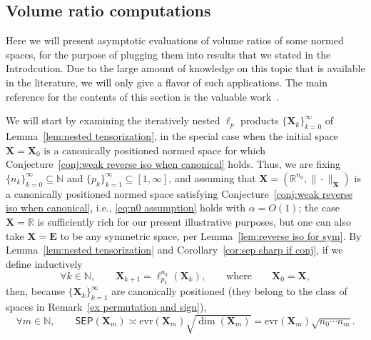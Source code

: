 \documentclass[11pt,reqno]{amsart}
\newcommand{\evr}{\mathrm{evr}}
\newcommand{\X}{\mathbf X}
\newcommand{\R}{\mathbb R}
\theoremstyle{remark}
\renewcommand{\subset}{\subseteq}
\newcommand{\N}{\mathbb N}
\renewcommand{\1}{\mathbf 1}
\newcommand{\sep}{\mathsf{SEP}}
\newcommand{\bfE}{\mathbf{E}}
\begin{document}
\subsection{Volume ratio computations}\label{sec:volume ratios} Here we will present asymptotic evaluations of volume ratios of some  normed spaces, for the purpose of plugging them into results that we stated in the Introdcution. Due to the large amount of knowledge on this topic that is available in the literature, we will only give a flavor of such applications. The main reference  for the contents of this section is the valuable work~\cite{Sch82}.

We will start by examining  the iteratively nested $\ell_p$ products $\{\X_k\}_{k=0}^\infty$ of Lemma~\ref{lem:nested tensorization}, in the special case when the initial space $\X=\X_0$  is a canonically positioned normed space for which Conjecture~\ref{conj:weak reverse iso when canonical} holds. Thus, we are fixing $\{n_k\}_{k=0}^\infty\subset  \N$ and $\{p_k\}_{k=1}^\infty\subset [1,\infty]$, and assuming that $\X=(\R^{n_0},\|\cdot\|_\X)$ is a canonically positioned normed space satisfying Conjecture~\ref{conj:weak reverse iso when canonical}, i.e., \eqref{eq:n0 assumption} holds with $\alpha=O(1)$; the case $\X=\R$ is sufficiently rich for our present illustrative purposes, but one can also take $\X=\bfE$ to be any symmetric space, per Lemma~\ref{lem:reverse iso for sym}. By Lemma~\ref{lem:nested tensorization} and Corollary~\ref{cor:sep sharp if conj}, if we define inductively
\begin{equation*}
\forall k\in \N, \qquad \X_{k+1}=\ell_{p_k}^{n_k}(\X_k), \qquad\mathrm{where}\qquad \X_0=\X,
\end{equation*}
then, because $\{\X_k\}_{k=1}^\infty$ are canonically positioned (they belong to the class of spaces in Remark~\ref{ex permutation and sign}),
\begin{equation}\label{eq:sep of nested}
\forall m\in \N,\qquad \sep(\X_m)\asymp \evr(\X_m)\sqrt{\dim(\X_m)}=\evr(\X_m)\sqrt{n_0\cdots n_m}.
\end{equation}
\end{document}
